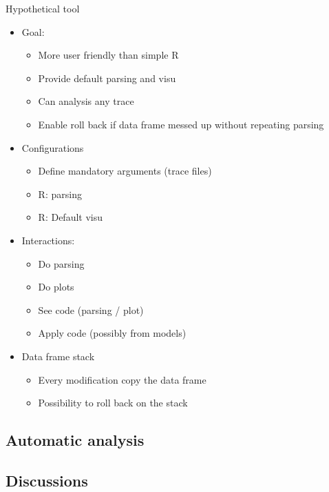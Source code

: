 Hypothetical tool
\begin{itemize}
    \item Goal:
        \begin{itemize}
            \item More user friendly than simple R
            \item Provide default parsing and visu
            \item Can analysis any trace
            \item Enable roll back if data frame messed up without repeating parsing
        \end{itemize}
    \item Configurations
        \begin{itemize}
            \item Define mandatory arguments (trace files)
            \item R: parsing
            \item R: Default visu
        \end{itemize}
    \item Interactions:
        \begin{itemize}
            \item Do parsing
            \item Do plots
            \item See code (parsing / plot)
            \item Apply code (possibly from models)
        \end{itemize}
    \item Data frame stack
        \begin{itemize}
            \item Every modification copy the data frame
            \item Possibility to roll back on the stack
        \end{itemize}
\end{itemize}

\subsection{Automatic analysis}


\subsection{Discussions}

